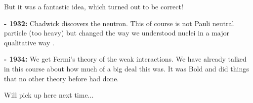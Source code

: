 {But it was a fantastic idea, which turned out to be correct! 


\textbf{- 1932:} Chadwick  discovers the neutron. This of course is not Pauli neutral particle (too heavy) but changed the way we understood nuclei in a major qualitative way . 

\textbf{- 1934:} We get Fermi's theory of the weak interactions.  We have already talked in this course about how much of a big deal this was. 
It was Bold and did things that no other theory before had done. 

Will pick up here next time...





}



